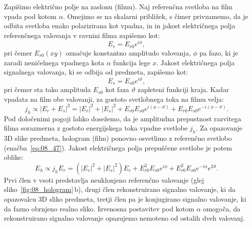 Zapišimo električno polje na zaslonu (filmu). Naj referenčna svetloba na film vpada pod 
kotom $\alpha$.
Omejimo se na skalarni približek, s čimer privzamemo, da je odbita svetloba enako polarizirana
kot vpadna, in in jakost električnega polja referenčnega valovanja v 
ravnini filma zapišemo kot:
\begin{equation}
E_r = E_{r0}e^{i\phi},
\label{eq:08_47}
\end{equation}
pri čemer $E_{r0}(xy)$ označuje konstantno amplitudo valovanja, $\phi$ pa fazo, 
ki je zaradi neničelnega vpadnega kota $\alpha$ funkcija lege $x$. Jakost električnega polja
signalnega valovanja, ki se odbija od predmeta, zapišemo kot:
\begin{equation}
E_s = E_{s0}e^{i\vartheta},
\label{eq:08_48}
\end{equation}
pri čemer sta tako amplituda $E_{s0}$ kot faza $\vartheta$ zapleteni funkciji kraja. 
Kadar vpadata na film obe valovanji, za gostoto svetlobnega toka na filmu velja:
\begin{equation}
j_h \propto |E_r + E_s|^2 = |E_r|^2 + |E_s|^2+ E_{r0}E_{s0}e^{i(\phi - \vartheta)} + 
E_{r0}E_{s0}e^{-i(\phi - \vartheta)}.
\label{eq:08_49}
\end{equation}
Pod določenimi pogoji lahko dosežemo, da je amplitudna prepustnost razvitega filma 
sorazmerna z gostoto energijskega toka vpadne svetlobe $j_h$.
Za opazovanje 3D slike predmeta, hologram (film) ponovno osvetlimo z referenčno 
svetlobo (enačba~\ref{eq:08_47}). Jakost električnega polja prepuščene svetlobe je potem oblike:
\begin{equation}
E_h \propto j_h E_r = \left(|E_r|^2 + |E_s|^2\right)E_r + E_{r0}^2E_{s0}e^{i\phi} + 
E_{r0}^2E_{s0}e^{-i\phi}e^{2\vartheta}.
\label{eq:08_50}
\end{equation}
Prvi člen v vsoti predstavlja neuklonjeno referenčno valovanje (glej sliko~\ref{fig:08_hologram}\,b), 
drugi člen rekonstruirano signalno valovanje, ki da opazovalcu 3D sliko predmeta, 
tretji člen pa je konjugirano signalno
valovanje, ki da fazno obrnjeno realno sliko.
Izvenosna postavitev pod kotom $\alpha$ omogoča, da rekonstruirano
signalno valovanje opazujemo nemoteno od ostalih dveh valovanj. 

